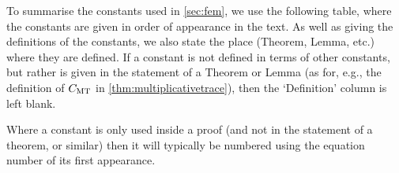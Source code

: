 To summarise the constants used in \cref{sec:fem}, we use the following table, where the constants are given in order of appearance in the text. As well as giving the definitions of the constants, we also state the place (Theorem, Lemma, etc.) where they are defined. If a constant is not defined in terms of other constants, but rather is given in the statement of a Theorem or Lemma (as for, e.g., the definition of $C_{\mathrm{MT}}$ in \cref{thm:multiplicativetrace}), then the `Definition' column is left blank.


Where a constant is only used inside a proof (and not in the statement of a theorem, or similar) then it will typically be numbered using the equation number of its first appearance.

\renewcommand{\arraystretch}{2.0}

